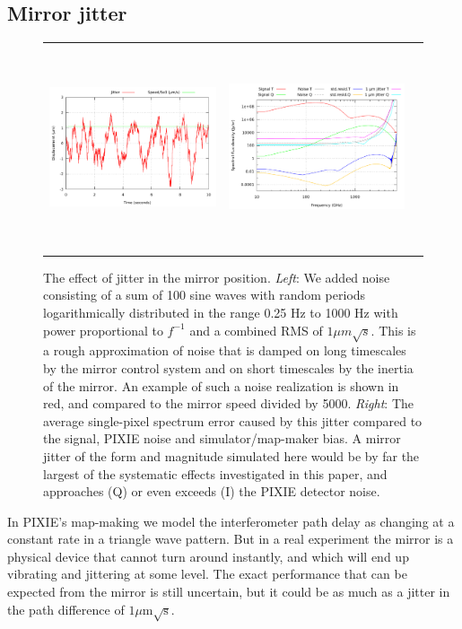 \documentclass{article}
\begin{document}
\subsection{Mirror jitter}
\begin{figure}
	\centering
	\hspace*{-5mm}\begin{tabular}{ccc}
		\includegraphics[height=57mm,clip,trim=0 0 5mm 0]{plots/jit_wave_noise_realization.pdf} &
		\includegraphics[height=60mm,clip,trim=0 0 6mm 0]{plots/jitter_abs_log_log.pdf}
	\end{tabular}
	\caption{The effect of jitter in the mirror position. \emph{Left}:
	We added noise consisting of a sum of 100 sine waves with random
	periods logarithmically distributed in the range 0.25 Hz to 1000 Hz
	with power proportional to $f^{-1}$ and a combined RMS of $1\mu
	m\sqrt{s}$. This is a rough approximation of noise that is damped
	on long timescales by the mirror control system and on short timescales
	by the inertia of the mirror. An example of such a noise realization
	is shown in red,
	and compared to the mirror speed divided by 5000. \emph{Right}:
	The average single-pixel spectrum error caused by this jitter
	compared to the signal, PIXIE noise and simulator/map-maker bias.
	A mirror jitter of the form and magnitude simulated here would be
	by far the largest of the systematic effects investigated in this
	paper, and approaches (Q) or even exceeds (I) the PIXIE detector
	noise.}
	\label{fig:jitter}
\end{figure}
In PIXIE's map-making we model the interferometer path delay as
changing at a constant rate in a triangle wave pattern. But in a
real experiment the mirror is a physical device that cannot turn
around instantly, and which will end up vibrating and jittering
at some level. The exact performance that can be expected from
the mirror is still uncertain, but it could be as much as a
jitter in the path difference of $1\mu\textrm{m}\sqrt{\textrm{s}}$.
\end{document}
